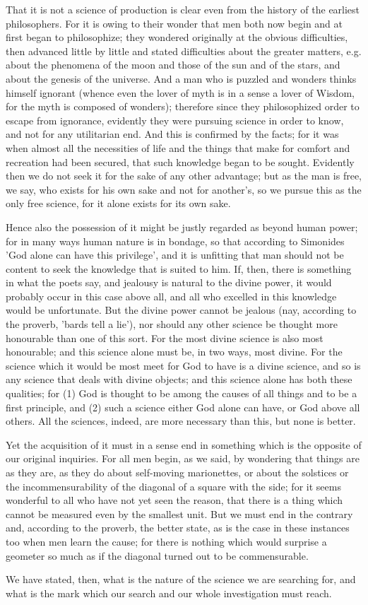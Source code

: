 \documentclass{article}
\begin{document}
That it is not a science of production is clear even from the history of the earliest philosophers. For it is owing to their wonder that men both now begin and at first began to philosophize; they wondered originally at the obvious difficulties, then advanced little by little and stated difficulties about the greater matters, e.g. about the phenomena of the moon and those of the sun and of the stars, and about the genesis of the universe. And a man who is puzzled and wonders thinks himself ignorant (whence even the lover of myth is in a sense a lover of Wisdom, for the myth is composed of wonders); therefore since they philosophized order to escape from ignorance, evidently they were pursuing science in order to know, and not for any utilitarian end. And this is confirmed by the facts; for it was when almost all the necessities of life and the things that make for comfort and recreation had been secured, that such knowledge began to be sought. Evidently then we do not seek it for the sake of any other advantage; but as the man is free, we say, who exists for his own sake and not for another's, so we pursue this as the only free science, for it alone exists for its own sake.

Hence also the possession of it might be justly regarded as beyond human power; for in many ways human nature is in bondage, so that according to Simonides 'God alone can have this privilege', and it is unfitting that man should not be content to seek the knowledge that is suited to him. If, then, there is something in what the poets say, and jealousy is natural to the divine power, it would probably occur in this case above all, and all who excelled in this knowledge would be unfortunate. But the divine power cannot be jealous (nay, according to the proverb, 'bards tell a lie'), nor should any other science be thought more honourable than one of this sort. For the most divine science is also most honourable; and this science alone must be, in two ways, most divine. For the science which it would be most meet for God to have is a divine science, and so is any science that deals with divine objects; and this science alone has both these qualities; for (1) God is thought to be among the causes of all things and to be a first principle, and (2) such a science either God alone can have, or God above all others. All the sciences, indeed, are more necessary than this, but none is better.

Yet the acquisition of it must in a sense end in something which is the opposite of our original inquiries. For all men begin, as we said, by wondering that things are as they are, as they do about self-moving marionettes, or about the solstices or the incommensurability of the diagonal of a square with the side; for it seems wonderful to all who have not yet seen the reason, that there is a thing which cannot be measured even by the smallest unit. But we must end in the contrary and, according to the proverb, the better state, as is the case in these instances too when men learn the cause; for there is nothing which would surprise a geometer so much as if the diagonal turned out to be commensurable.

We have stated, then, what is the nature of the science we are searching for, and what is the mark which our search and our whole investigation must reach.
\end{document}
